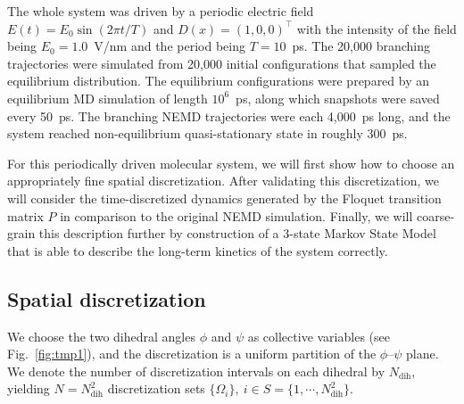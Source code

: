 \documentclass[journal=jctcce,manuscript=article]{achemso}
\newcommand{\redc}[1]{{\color{red} #1}}
\newcommand{\vect}[1]{#1}
\newcommand{\dih}{\textrm{dih}}
\begin{document}
The whole system was driven by a periodic electric field
$E(t) = E_0\sin(2\pi t/T)$ and $D(x) = (1,0,0)^{\top}$
with the intensity of the field being $E_0 = 1.0$~V/nm and the period being
$T = 10$~ps.
The 20,000 branching trajectories were simulated from 20,000
initial configurations that sampled the equilibrium distribution.
The equilibrium configurations were prepared by an equilibrium MD simulation
of length $10^6$~ps, along which snapshots were saved every 50~ps.
The branching NEMD
trajectories were each 4,000~ps long, and the system reached
non-equilibrium quasi-stationary state in roughly 300~ps.


For this periodically driven molecular system, we will first show how to choose an appropriately fine spatial discretization. After validating this discretization, we will consider
the time-discretized dynamics generated by the Floquet transition matrix $\vect P$
in comparison to the original NEMD simulation. Finally, we will coarse-grain this description further by construction of a $3$-state Markov State Model that is able to describe the long-term kinetics of the system correctly. 

\subsection{Spatial discretization}

We choose the
two dihedral angles $\phi$ and $\psi$ as collective variables (see
Fig.~\ref{fig:tmp1}), and the discretization is a uniform partition of
the $\phi$--$\psi$ plane. We denote the number of discretization intervals on each
dihedral by $N_\dih$, yielding $N = N_\dih^2$ discretization sets 
$\{\Omega_i\},\ i\in S = \{1,\cdots,N_\dih^2\}$.
\end{document}
